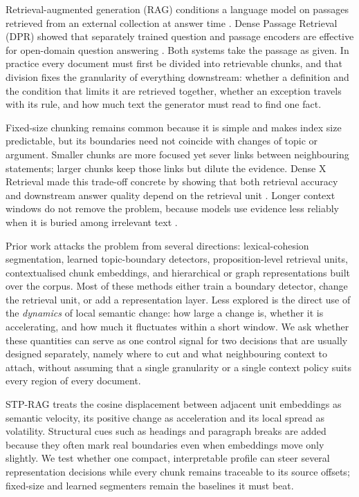 \documentclass[10pt,a4paper]{article}
\begin{document}
Retrieval-augmented generation (RAG) conditions a language model on passages retrieved from an external collection at answer time \cite{lewis2020rag}. Dense Passage Retrieval (DPR) showed that separately trained question and passage encoders are effective for open-domain question answering \cite{karpukhin2020dpr}. Both systems take the passage as given. In practice every document must first be divided into retrievable chunks, and that division fixes the granularity of everything downstream: whether a definition and the condition that limits it are retrieved together, whether an exception travels with its rule, and how much text the generator must read to find one fact.

Fixed-size chunking remains common because it is simple and makes index size predictable, but its boundaries need not coincide with changes of topic or argument. Smaller chunks are more focused yet sever links between neighbouring statements; larger chunks keep those links but dilute the evidence. Dense X Retrieval made this trade-off concrete by showing that both retrieval accuracy and downstream answer quality depend on the retrieval unit \cite{chen2024densex}. Longer context windows do not remove the problem, because models use evidence less reliably when it is buried among irrelevant text \cite{liu2024lostmiddle}.

Prior work attacks the problem from several directions: lexical-cohesion segmentation, learned topic-boundary detectors, proposition-level retrieval units, contextualised chunk embeddings, and hierarchical or graph representations built over the corpus. Most of these methods either train a boundary detector, change the retrieval unit, or add a representation layer. Less explored is the direct use of the \emph{dynamics} of local semantic change: how large a change is, whether it is accelerating, and how much it fluctuates within a short window. We ask whether these quantities can serve as one control signal for two decisions that are usually designed separately, namely where to cut and what neighbouring context to attach, without assuming that a single granularity or a single context policy suits every region of every document.

STP-RAG treats the cosine displacement between adjacent unit embeddings as semantic velocity, its positive change as acceleration and its local spread as volatility. Structural cues such as headings and paragraph breaks are added because they often mark real boundaries even when embeddings move only slightly. We test whether one compact, interpretable profile can steer several representation decisions while every chunk remains traceable to its source offsets; fixed-size and learned segmenters remain the baselines it must beat.
\end{document}
